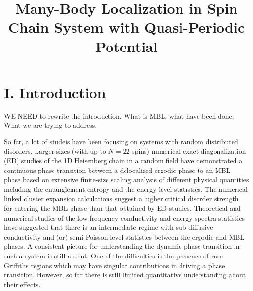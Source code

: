 \documentclass[prl,aps,epsf,showpacs,twocolumn]{revtex4}
\begin{document}
\title{Many-Body Localization in Spin Chain System with Quasi-Periodic Potential}
\author{} 


\begin{abstract} 


\end{abstract}

\maketitle


\section{I.  Introduction}

WE NEED to rewrite  the introduction.   What is MBL,   what have been done.    What we are trying to address.





So far,   a lot of studeis have been focusing on systems with random distributed disorders.  
Larger sizes (with up to $N=22$ spins) numerical  exact diagonalization (ED) studies\cite{luitz2015}  of
the 1D Heisenberg chain in a random field have  demonstrated a continuous  phase transition 
between a delocalized ergodic  phase  to an MBL  phase based on extensive finite-size scaling analysis
of different physical quantities including the  entanglement entropy  and  the energy level statistics.
The numerical linked cluster expansion calculations suggest a higher critical disorder strength  for entering the MBL phase\cite{devakul2015} 
  than that obtained by ED studies\cite{luitz2015}. 
Theoretical\cite{vosk_theory2014}  and numerical  studies of the  low frequency conductivity\cite{agarwal2015, knap2015} and 
energy spectra statistics\cite{serbyn2015} have  
suggested that there is an intermediate regime  with sub-diffusive conductivity
and (or)  semi-Poisson level statistics  between the ergodic and MBL phases.
A consistent picture for understanding the dynamic  phase transition in such a system is still absent.
One of the  difficulties  is the presence of  rare Griffiths regions\cite{vosk_theory2014, potter2015trans, knap2015}
which may have  singular contributions in  driving a  phase transition. However, so far there is
still limited  quantitative understanding about  their effects.
\end{document}
